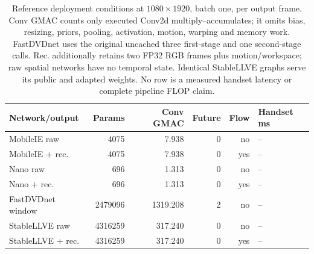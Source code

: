 \begin{table}[t]
\centering\small
\caption{Reference deployment conditions at $1080\times1920$, batch one, per output frame. Conv GMAC counts only executed Conv2d multiply--accumulates; it omits bias, resizing, priors, pooling, activation, motion, warping and memory work. FastDVDnet uses the original uncached three first-stage and one second-stage calls. Rec. additionally retains two FP32 RGB frames plus motion/workspace; raw spatial networks have no temporal state. Identical StableLLVE graphs serve its public and adapted weights. No row is a measured handset latency or complete pipeline FLOP claim.}
\label{tab:reference-budget}
\begin{tabular}{lrrrrl}
\toprule
Network/output & Params & Conv GMAC & Future & Flow & Handset ms\\
\midrule
MobileIE raw & 4075 & 7.938 & 0 & no & --\\
MobileIE + rec. & 4075 & 7.938 & 0 & yes & --\\
Nano raw & 696 & 1.313 & 0 & no & --\\
Nano + rec. & 696 & 1.313 & 0 & yes & --\\
FastDVDnet window & 2479096 & 1319.208 & 2 & no & --\\
StableLLVE raw & 4316259 & 317.240 & 0 & no & --\\
StableLLVE + rec. & 4316259 & 317.240 & 0 & yes & --\\
\bottomrule
\end{tabular}
\end{table}
